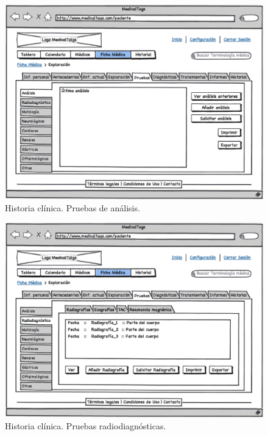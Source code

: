\documentclass[a4paper,oneside,11pt]{book}
\begin{document}
			
			
			\begin{figure}[H]
			  \centering
			    \includegraphics[width=12cm]{img/eps/34_Pruebas_Pacientes.eps}
			  \caption{Historia clínica. Pruebas de análisis.}
			  \label{fig:prueba_analisis}
			\end{figure}
			
			\begin{figure}[H]
			  \centering
			    \includegraphics[width=12cm]{img/eps/35_Pruebas_Pacientes2.eps}
			  \caption{Historia clínica. Pruebas radiodiagnósticas.}
			  \label{fig:prueba_radio}
			\end{figure}
				
\end{document}
